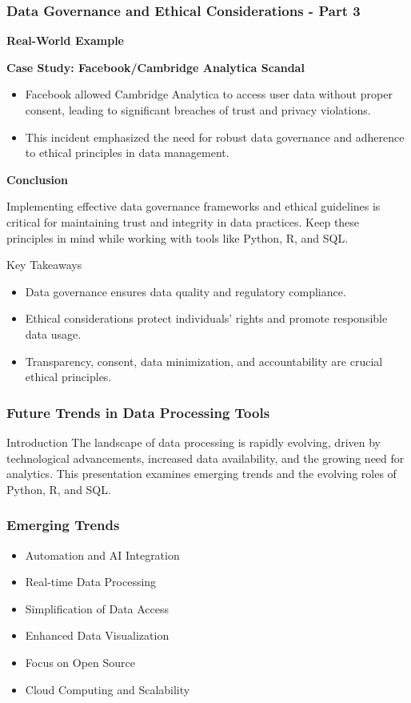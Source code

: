 \documentclass[aspectratio=169]{beamer}
\begin{document}
\begin{frame}[fragile]
    \frametitle{Data Governance and Ethical Considerations - Part 3}
    \textbf{Real-World Example}
    
    \textbf{Case Study: Facebook/Cambridge Analytica Scandal}
    \begin{itemize}
        \item Facebook allowed Cambridge Analytica to access user data without proper consent, leading to significant breaches of trust and privacy violations.
        \item This incident emphasized the need for robust data governance and adherence to ethical principles in data management.
    \end{itemize}
    
    \textbf{Conclusion}
    
    Implementing effective data governance frameworks and ethical guidelines is critical for maintaining trust and integrity in data practices. Keep these principles in mind while working with tools like Python, R, and SQL.
    
    \begin{block}{Key Takeaways}
        \begin{itemize}
            \item Data governance ensures data quality and regulatory compliance.
            \item Ethical considerations protect individuals' rights and promote responsible data usage.
            \item Transparency, consent, data minimization, and accountability are crucial ethical principles.
        \end{itemize}
    \end{block}
\end{frame}

\begin{frame}[fragile]
    \frametitle{Future Trends in Data Processing Tools}
    \begin{block}{Introduction}
        The landscape of data processing is rapidly evolving, driven by technological advancements, increased data availability, and the growing need for analytics. This presentation examines emerging trends and the evolving roles of Python, R, and SQL.
    \end{block}
\end{frame}

\begin{frame}[fragile]
    \frametitle{Emerging Trends}
    \begin{itemize}
        \item Automation and AI Integration
        \item Real-time Data Processing
        \item Simplification of Data Access
        \item Enhanced Data Visualization
        \item Focus on Open Source
        \item Cloud Computing and Scalability
    \end{itemize}
\end{frame}
\end{document}
